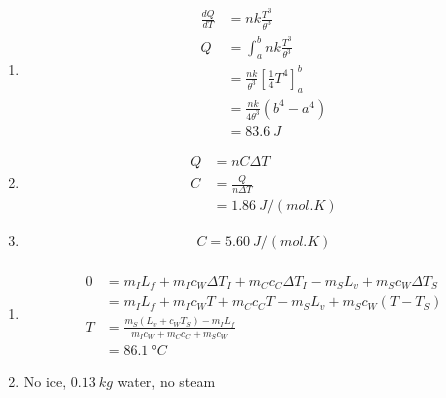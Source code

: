 \documentclass{article}
\begin{document}
\begin{enumerate}
  \item

        \begin{align*}
          \frac{dQ}{dT} & = n k \frac{T^3}{\theta^3}                                \\
          Q             & = \int_a^b n k \frac{T^3}{\theta^3}                       \\
                        & = \frac{n k}{\theta^3} \left[ \frac{1}{4} T^4 \right]_a^b \\
                        & = \frac{n k}{4 \theta^3} (b^4 - a^4)                      \\
                        & = \qty{83.6}{J}
        \end{align*}

  \item

        \begin{align*}
          Q & = n C \Delta T          \\
          C & = \frac{Q}{n \Delta T}  \\
            & = \qty{1.86}{J/(mol.K)}
        \end{align*}

  \item \[C = \qty{5.60}{J/(mol.K)}\]
\end{enumerate}

\setcounter{subsubsection}{94}
\subsubsection{}

\begin{enumerate}
  \item

        \begin{align*}
          0 & = m_I L_f + m_I c_W \Delta T_I + m_C c_C \Delta T_I - m_S L_v + m_S c_W \Delta T_S \\
            & = m_I L_f + m_I c_W T + m_C c_C T - m_S L_v + m_S c_W (T - T_S)                    \\
          T & = \frac{m_S (L_v + c_W T_S) - m_I L_f}{m_I c_W + m_C c_C + m_S c_W}                \\
            & = \qty{86.1}{\degree C}
        \end{align*}

  \item No ice, $\qty{0.13}{kg}$ water, no steam
\end{enumerate}
\end{document}
